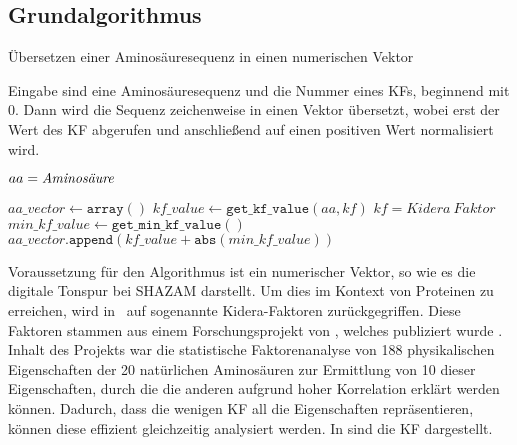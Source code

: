     \subsection{Grundalgorithmus} %
        \label{sub:grundalgorithmus}
        \begin{algorithm}[H]
            \caption{Übersetzen einer Aminosäuresequenz in einen numerischen Vektor}\label{alg:vorbereitung}
            Eingabe sind eine Aminosäuresequenz und die Nummer eines \acl{KF}s, beginnend mit 0. Dann wird die Sequenz zeichenweise in einen Vektor übersetzt, wobei erst der Wert des \ac{KF} abgerufen und anschließend auf einen positiven Wert normalisiert wird.
            \newcommand{\I}{\text{\textquotesingle}}
            \begin{algorithmic}[1]

                \myRequire{
                    $sequence \in \{ \text{A-Z}, \I\Psi\I, \I\Omega\I, \I\Phi\I, \I\zeta\I, \I\Pi\I, \I\text{+}\I, \I\text{-}\I\}^{*} $\\
                    $0 \leq kf \leq 9$
                }
                \Comment $aa = \emph{Aminosäure}$

                \State $aa\_vector \gets \texttt{array}()$
                    \State $kf\_value \gets \texttt{get\_kf\_value}(aa, kf)$ \Comment $kf=Kidera\ Faktor$
                    \State $min\_kf\_value \gets \texttt{get\_min\_kf\_value}()$
                    \State $aa\_vector.\texttt{append}(kf\_value + \texttt{abs}(min\_kf\_value))$
                \EndFor
            \end{algorithmic}
        \end{algorithm}
        Voraussetzung für den Algorithmus ist ein numerischer Vektor, so wie es die digitale Tonspur bei SHAZAM darstellt. Um dies im Kontext von Proteinen zu erreichen, wird in \protfin\ auf sogenannte Kidera-Faktoren zurückgegriffen. Diese Faktoren stammen aus einem Forschungsprojekt von \citeauthor{kidera}, welches  publiziert wurde \autocite{kidera}. Inhalt des Projekts war die statistische Faktorenanalyse von 188 physikalischen Eigenschaften der 20 natürlichen Aminosäuren zur Ermittlung von 10 dieser Eigenschaften, durch die die anderen aufgrund hoher Korrelation erklärt werden können. Dadurch, dass die wenigen \ac{KF} all die Eigenschaften repräsentieren, können diese effizient gleichzeitig analysiert werden. In  sind die \ac{KF} dargestellt.

